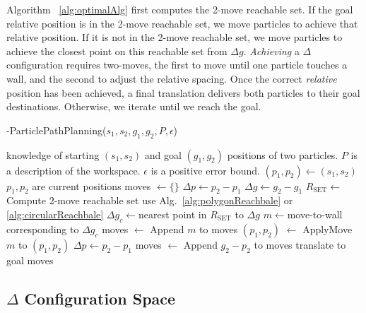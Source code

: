  Algorithm ~\ref{alg:optimalAlg} first computes the 2-move reachable set. If the goal relative position is in the 2-move reachable set, we move particles to achieve that relative position. If it is not in the 2-move reachable set, we move particles to achieve the closest point on this reachable set from $\Delta g$. 
 \emph{Achieving} a $\Delta$ configuration requires two-moves, the first to move until one particle touches a wall, and the second to adjust the relative spacing.
 Once the correct \emph{relative} position has been achieved, a final translation delivers both particles to their goal destinations. %
 Otherwise, we iterate until we reach the goal. 
\begin{algorithm}[htb]
\caption{ { -ParticlePathPlanning}($s_1,s_2,g_1,g_2,P,\epsilon$)}\label{alg:optimalAlg}
\begin{algorithmic}[1]
\Require knowledge of starting $(s_1,s_2)$ and goal $(g_1,g_2)$ positions of  two particles. 
 $P$ is a description of the workspace. $\epsilon$ is a positive error bound.
 \State $(p_1,p_2) \gets (s_1,s_2) $ \Comment $p_1 , p_2$ are current positions
\State  moves $\gets \{\}$
 \State $\Delta p \gets p_2-p_1$
 \State $\Delta g \gets g_2-g_1$
\State $R_{\textrm{SET}}\gets$  Compute 2-move reachable set  \Comment use Alg.~\ref{alg:polygonReachbale} or \ref{alg:circularReachbale}
\State $ \Delta g_c\gets $nearest point in $R_{\textrm{SET}}$ to $\Delta g$
\State $m \gets $move-to-wall corresponding to $\Delta g_c$
\State moves $\gets$ Append $m$ to moves
\State $(p_1, p_2)$ $\gets$ ApplyMove $m$ to $(p_1,p_2)$
 \State $\Delta p \gets p_2-p_1$
\EndWhile
\State moves $\gets$ Append $g_2-p_2$ to moves \Comment translate to goal
\State \Return moves
\end{algorithmic}
\end{algorithm}


\subsection{$\Delta$ Configuration Space}
 
